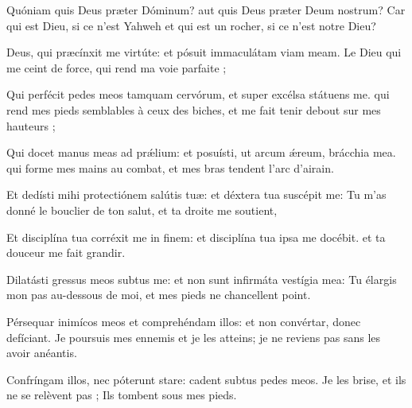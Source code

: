 
\begin{paracol}{2}

\LigneParacol{0cm}
{Quóniam quis Deus præter Dóminum? \GreStar{} aut quis Deus præter Deum nostrum?}
{Car qui est Dieu, si ce n'est Yahweh et qui est un rocher, si ce n'est notre Dieu? }

\LigneParacol{0.2cm}
{Deus, qui præcínxit me virtúte: \GreStar{} et pósuit immaculátam viam meam.}
{Le Dieu qui me ceint de force, qui rend ma voie parfaite ; }

\LigneParacol{0.2cm}
{Qui perfécit pedes meos tamquam cervórum, \GreStar{} et super excélsa státuens me.}
{qui rend mes pieds semblables à ceux des biches, et me fait tenir debout sur mes hauteurs ; }

\LigneParacol{0.2cm}
{Qui docet manus meas ad prǽlium: \GreStar{} et posuísti, ut arcum ǽreum, brácchia mea.}
{qui forme mes mains au combat, et mes bras tendent l'arc d'airain. }

\LigneParacol{0.2cm}
{Et dedísti mihi protectiónem salútis tuæ: \GreStar{} et déxtera tua suscépit me:}
{Tu m'as donné le bouclier de ton salut, et ta droite me soutient,}

\LigneParacol{0.2cm}
{Et disciplína tua corréxit me in finem: \GreStar{} et disciplína tua ipsa me docébit.}
{et ta douceur me fait grandir. }

\LigneParacol{0.2cm}
{Dilatásti gressus meos subtus me: \GreStar{} et non sunt infirmáta vestígia mea:}
{Tu élargis mon pas au-dessous de moi, et mes pieds ne chancellent point. }

\LigneParacol{0.2cm}
{Pérsequar inimícos meos et comprehéndam illos: \GreStar{} et non convértar, donec defíciant.}
{Je poursuis mes ennemis et je les atteins; je ne reviens pas sans les avoir anéantis. }

\LigneParacol{0.2cm}
{Confríngam illos, nec póterunt stare: \GreStar{} cadent subtus pedes meos.}
{Je les brise, et ils ne se relèvent pas ; Ils tombent sous mes pieds. }

\end{paracol}
\Gloria
